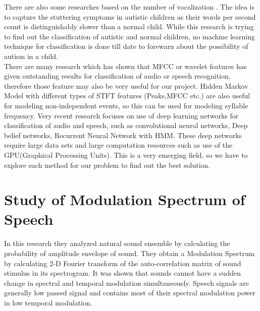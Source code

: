 \documentclass[11pt]{report}
\begin{document}
There are also some researches based on the number of vocalization \cite{motor}. The idea is to capture the stuttering symptoms in autistic children as their words per second count is distinguishably slower than a normal child. While this research is trying to find out the classification of autistic and normal children, no machine learning technique for classification is done till date to forewarn about the possibility of autism in a child.\\

There are many research which has shown that MFCC or wavelet features has given outstanding results  for classification of audio or speech recognition, therefore those feature may also be very useful for our project. Hidden Markov Model with different types of STFT features (Peaks,MFCC etc.) are also useful for modeling non-independent events, so this can be used for modeling syllable frequency. Very recent research focuses on use of deep learning networks for classification of audio  and speech, such as convolutional neural networks, Deep belief networks, Recurrent Neural Network with HMM. These deep networks require large data sets and large computation resources such as use of the GPU(Graphical Processing Units). This is a very emerging field, so we have to explore each method for our problem to find out the best solution.

\section{Study of Modulation Spectrum of Speech}
In this research they analyzed natural sound ensemble by calculating the probability of amplitude envelope of sound. They obtain a Modulation Spectrum \cite{acoustic} by calculating 2-D Fourier transform of the auto-correlation matrix of sound stimulus in its spectrogram. It was shown that sounds cannot have a sudden change in spectral and temporal modulation simultaneously. Speech signals are generally low passed signal and contains most of their spectral modulation power in low temporal modulation.
\end{document}
